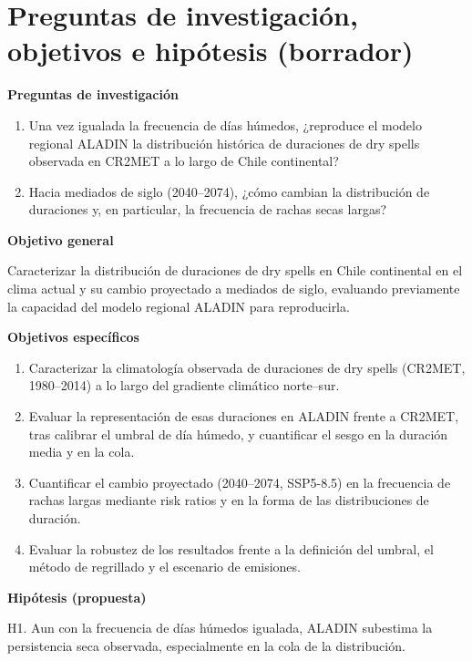 \section{Preguntas de investigación, objetivos e hipótesis (borrador)}\label{sec:objetivos}

\textbf{Preguntas de investigación}

\begin{enumerate}
\def\labelenumi{\arabic{enumi}.}
\tightlist
\item
  Una vez igualada la frecuencia de días húmedos, ¿reproduce el modelo regional ALADIN la distribución histórica de duraciones de dry spells observada en CR2MET a lo largo de Chile continental?
\item
  Hacia mediados de siglo (2040--2074), ¿cómo cambian la distribución de duraciones y, en particular, la frecuencia de rachas secas largas?
\end{enumerate}

\textbf{Objetivo general}

Caracterizar la distribución de duraciones de dry spells en Chile continental en el clima actual y su cambio proyectado a mediados de siglo, evaluando previamente la capacidad del modelo regional ALADIN para reproducirla.

\textbf{Objetivos específicos}

\begin{enumerate}
\def\labelenumi{\arabic{enumi}.}
\tightlist
\item
  Caracterizar la climatología observada de duraciones de dry spells (CR2MET, 1980--2014) a lo largo del gradiente climático norte--sur.
\item
  Evaluar la representación de esas duraciones en ALADIN frente a CR2MET, tras calibrar el umbral de día húmedo, y cuantificar el sesgo en la duración media y en la cola.
\item
  Cuantificar el cambio proyectado (2040--2074, SSP5-8.5) en la frecuencia de rachas largas mediante risk ratios y en la forma de las distribuciones de duración.
\item
  Evaluar la robustez de los resultados frente a la definición del umbral, el método de regrillado y el escenario de emisiones.
\end{enumerate}

\textbf{Hipótesis (propuesta)}

H1. Aun con la frecuencia de días húmedos igualada, ALADIN subestima la persistencia seca observada, especialmente en la cola de la distribución.


